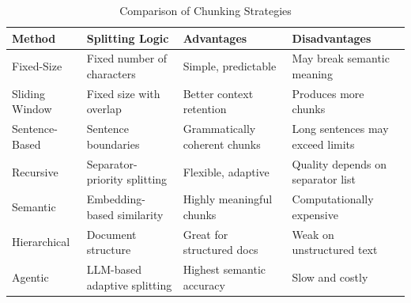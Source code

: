\documentclass[conference]{IEEEtran}
\begin{document}
\begin{table}[htbp]
\caption{Comparison of Chunking Strategies}
\begin{center}
\begin{tabular}{|p{1.25cm}|p{2cm}|p{1.75cm}|p{1.75cm}|}
\hline
\textbf{Method} & \textbf{Splitting Logic} & \textbf{Advantages} & \textbf{Disadvantages} \\
\hline
Fixed-Size & 
Fixed number of characters &
Simple, predictable &
May break semantic meaning \\
\hline
Sliding Window &
Fixed size with overlap &
Better context retention &
Produces more chunks \\
\hline
Sentence-Based &
Sentence boundaries &
Grammatically coherent chunks &
Long sentences may exceed limits \\
\hline
Recursive &
Separator-priority splitting &
Flexible, adaptive &
Quality depends on separator list \\
\hline
Semantic &
Embedding-based similarity &
Highly meaningful chunks &
Computationally expensive \\
\hline
Hierarchical &
Document structure &
Great for structured docs &
Weak on unstructured text \\
\hline
Agentic &
LLM-based adaptive splitting &
Highest semantic accuracy &
Slow and costly \\
\hline
\end{tabular}
\label{tab:chunking_comparison}
\end{center}
\end{table}

\nocite{ranganath2025rag}



\end{document}
